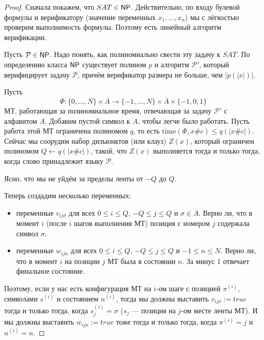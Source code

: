 \documentclass[a4paper, 12pt]{article}
\begin{document}
\begin{proof}
  Сначала покажем, что $SAT \in \NPclass$. Действительно, по входу булевой
  формулы и верификатору (значение переменных $x_1, \ldots, x_n$) мы с лёгкостью
  проверим выполнимость формулы. Поэтому есть линейный алгоритм верификации.

  Пусть $\mathcal{P} \in \NPclass$. Надо понять, как полиномиально свести
  эту задачу к $SAT$. По определению класса $\NPclass$ существует полином
  $p$ и алгоритм $\mathcal{P'}$, который верифицирует задачу $\mathcal{P}$, 
  причём верификатор размера не больше, чем $|p(|x|)|$.

  Пусть
  \[
    \Phi : \{0, \ldots, N\} \times \overline{A} \to \{-1, \ldots, N\}
    \times \overline{A} \times \{-1, 0, 1\}
  \]
  МТ, работающая за полиномиальное время, отвечающая за задачу $\mathcal{P'}$
  с алфавитом $A$. Добавим пустой символ к $A$, чтобы легче было работать.
  Пусть работа этой МТ ограничена полиномом $q$, то есть time$(\Phi, x\#c)
  \leqslant q(|x\#c|)$. Сейчас мы соорудим набор дизъюнктов 
  (или клауз) $Z(x)$, который
  ограничен полиномом $Q \gets q(|x\#c|)$, такой, что $Z(x)$ выполняется
  тогда и только тогда, когда слово принадлежит языку $\mathcal{P}$.

  Ясно, что мы не уйдём за пределы ленты от $-Q$ до $Q$.

  Теперь создадим несколько переменных:
  \begin{itemize}
    \item переменные $v_{ij\sigma}$ для всех $0 \leqslant i \leqslant Q$,
    $-Q \leqslant j \leqslant Q$ и $\sigma \in \overline{A}$. Верно ли, что
    в момент $i$ (после $i$ шагов выполнения МТ) позиция с номером $j$ содержала
    символ $\sigma$.

    \item переменные $w_{ijn}$ для всех $0 \leqslant i \leqslant Q$,
    $-Q \leqslant j \leqslant Q$ и $-1 \leqslant n \leqslant N$. Верно ли, что
    в момент $i$ на позиции $j$ МТ была в состоянии $n$. За минус 1 отвечает
    финальное состояние.
  \end{itemize}

  Поэтому, если у нас есть конфигурация МТ на $i$-ом шаге
  с позицией $\pi^{(i)}$, символами $s^{(i)}$ и состоянием $n^{(i)}$, тогда
  мы должны выставить $v_{ij\sigma} := true$ тогда и только тогда, когда
  $s_j^{(i)} = \sigma$ ($s_j$ --- позиция на $j$-ом месте ленты МТ). И мы должны
  выставить $w_{ijn} := true$ тоже тогда и только тогда, когда $\pi^{(i)} = j$ и
  $n^{(i)} = n$.


\end{proof}
\end{document}
